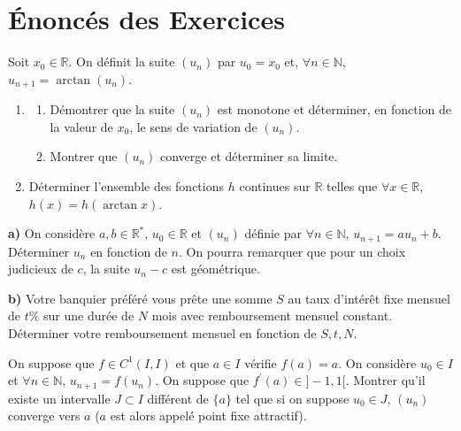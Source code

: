 

\section{Énoncés des Exercices}

\begin{exercice}
Soit $x_{0}\in\mathbb{R}$. On définit la suite $(u_{n})$ par $u_{0}=x_{0}$ et, $\forall n\in\mathbb{N}$, $u_{n+1}=\arctan(u_{n}).$
\begin{enumerate}
    \item 
    \begin{enumerate}
        \item Démontrer que la suite $(u_{n})$ est monotone et déterminer, en fonction de la valeur de $x_{0}$, le sens de variation de $(u_{n})$.
        \item Montrer que $(u_{n})$ converge et déterminer sa limite.
    \end{enumerate}
    \item Déterminer l'ensemble des fonctions $h$ continues sur $\mathbb{R}$ telles que $\forall x\in\mathbb{R}$, $h(x)=h(\arctan x)$.
\end{enumerate}
\end{exercice}

\begin{exercice}
\textbf{a)} On considère $a, b\in\mathbb{R}^{*}$, $u_{0}\in\mathbb{R}$ et $(u_{n})$ définie par $\forall n\in\mathbb{N}$, $u_{n+1}=au_{n}+b$.
Déterminer $u_{n}$ en fonction de $n$. On pourra remarquer que pour un choix judicieux de $c$, la suite $u_{n}-c$ est géométrique.

\textbf{b)} Votre banquier préféré vous prête une somme $S$ au taux d'intérêt fixe mensuel de $t\%$ sur une durée de $N$ mois avec remboursement mensuel constant.
Déterminer votre remboursement mensuel en fonction de $S, t, N$.
\end{exercice}

\begin{exercice}
On suppose que $f\in C^{1}(I,I)$ et que $a\in I$ vérifie $f(a)=a$.
On considère $u_{0}\in I$ et $\forall n\in\mathbb{N}$, $u_{n+1}=f(u_{n})$.
On suppose que $f^{\prime}(a)\in]-1,1[$.
Montrer qu'il existe un intervalle $J\subset I$ différent de $\{a\}$ tel que si on suppose $u_{0}\in J$, $(u_n)$ converge vers $a$ ($a$ est alors appelé point fixe attractif).
\end{exercice}

